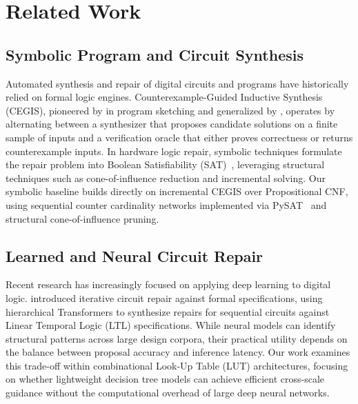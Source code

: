 \documentclass[11pt,a4paper]{article}
\begin{document}
\section{Related Work}

\subsection{Symbolic Program and Circuit Synthesis}
Automated synthesis and repair of digital circuits and programs have historically relied on formal logic engines. Counterexample-Guided Inductive Synthesis (CEGIS), pioneered by \citet{solar2006combinatorial} in program sketching and generalized by \citet{jha2010oracle}, operates by alternating between a synthesizer that proposes candidate solutions on a finite sample of inputs and a verification oracle that either proves correctness or returns counterexample inputs. In hardware logic repair, symbolic techniques formulate the repair problem into Boolean Satisfiability (SAT)~\citep{smith2005fault}, leveraging structural techniques such as cone-of-influence reduction and incremental solving. Our symbolic baseline builds directly on incremental CEGIS over Propositional CNF, using sequential counter cardinality networks implemented via PySAT~\citep{ignatiev2018pysat} and structural cone-of-influence pruning.

\subsection{Learned and Neural Circuit Repair}
Recent research has increasingly focused on applying deep learning to digital logic. \citet{cosler2023iterative} introduced iterative circuit repair against formal specifications, using hierarchical Transformers to synthesize repairs for sequential circuits against Linear Temporal Logic (LTL) specifications. While neural models can identify structural patterns across large design corpora, their practical utility depends on the balance between proposal accuracy and inference latency. Our work examines this trade-off within combinational Look-Up Table (LUT) architectures, focusing on whether lightweight decision tree models can achieve efficient cross-scale guidance without the computational overhead of large deep neural networks.
\end{document}
